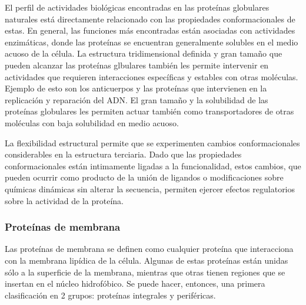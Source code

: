 El perfil de actividades biológicas encontradas en las proteínas globulares naturales está directamente relacionado con las propiedades conformacionales de estas.
En general, las funciones más encontradas están asociadas con actividades enzimáticas, donde las proteínas se encuentran generalmente solubles en el medio acuoso de la célula.
La estructura tridimensional definida y gran tamaño que pueden alcanzar las proteínas glbulares también les permite intervenir en actividades que requieren interacciones específicas y estables con otras moléculas. Ejemplo de esto son los anticuerpos y las proteínas que intervienen en la replicación y reparación del ADN.
El gran tamaño y la solubilidad de las proteínas globulares les permiten actuar también como transportadores de otras moléculas con baja solubilidad en medio acuoso.

La flexibilidad estructural permite que se experimenten cambios conformacionales considerables en la estructura terciaria. 
Dado que las propiedades conformacionales están intimamente ligadas a la funcionalidad, estos cambios, 
que pueden ocurrir como producto de la unión de ligandos o modificaciones sobre químicas dinámicas sin alterar la secuencia, permiten ejercer efectos regulatorios sobre la actividad de la proteína.






% 
% 
% 

















\subsubsection{Proteínas de membrana}
Las proteínas de membrana se definen como cualquier proteína que interacciona con la membrana lipídica de la célula.
Algunas de estas proteínas están unidas sólo a la superficie de la membrana, mientras que otras tienen regiones que se insertan en el núcleo hidrofóbico.
Se puede hacer, entonces, una primera clasificación en 2 grupos: proteínas integrales y periféricas.

